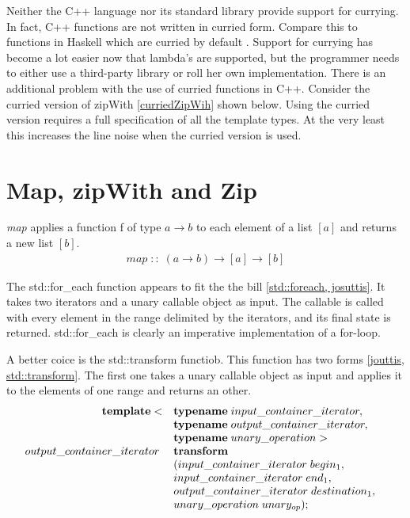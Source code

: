 \documentclass[12pt,fleqn]{article}
\begin{document}
Neither the C++ language nor its standard library provide support for currying. 
In fact, C++ functions are not written in curried form. 
Compare this to functions in Haskell which are curried by default \cite{lipovaca, hutton}.
Support for currying has become a lot easier now that lambda's are supported, but the programmer needs to either use a third-party library or roll her own implementation.
There is an additional problem with the use of curried functions in C++.
Consider the curried version of zipWith \ref{curriedZipWih} shown below.
Using the curried version requires a full specification of all the template types.
At the very least this increases the line noise when the curried version is used.
 
%
\section*{Map, zipWith and Zip}
%
%
{\em map} applies a function f of type $a \rightarrow b$ to each element of a list $[a]$ and returns a new list $[b]$. 
\begin{eqnarray*}
map \;::\; (a \rightarrow b) \rightarrow [a] \rightarrow [b]
\end{eqnarray*}
 
The std::for\_each function appears to fit the the bill \ref{std::foreach, josuttis}.
It takes two iterators and a unary callable object as input.
The callable is called with every element in the range delimited by the iterators, and its final state is returned.
std::for\_each is clearly an imperative implementation of a for-loop.

A better coice is the std::transform functiob. 
This function has two forms \ref{jouttis, std::transform}.
The first one takes a unary callable object as input and applies it to the elements of one range and returns an other.
\[
\begin{array}{rll}
\mbox{\bf template}<&\mbox{\bf typename}\; input\_container\_iterator, \\
               &\mbox{\bf typename} \; output \_container\_iterator, \\
             &\mbox{\bf typename} \; unary\_operation >&\\
output\_container\_iterator\;& \mbox{\bf transform}\\
&( input\_container\_iterator\; begin_1, \\
& input\_container\_iterator \; end_1, \\
& output\_container\_iterator \; destination_1, \\
& unary\_operation \; unary_{op} );
\end{array}
\]
\end{document}
